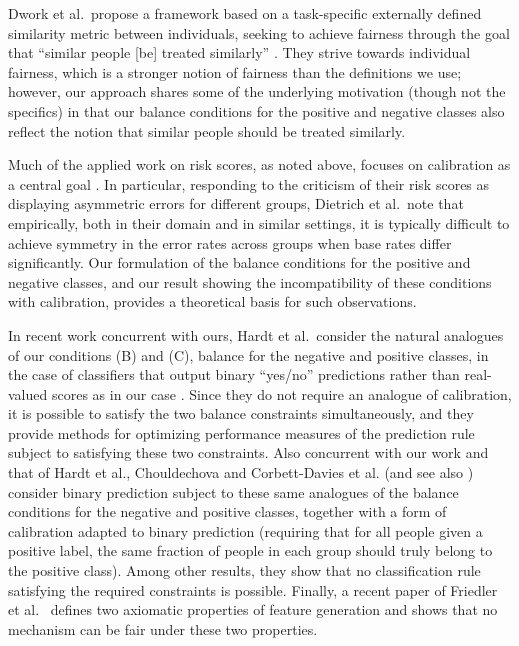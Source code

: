\documentclass[11pt]{article}
\begin{document}
Dwork et al.~propose a framework based on a task-specific externally defined
similarity metric between individuals, seeking to achieve fairness through the
goal that ``similar people [be] treated similarly''
\cite{dwork-fairness-awareness}. 
They strive towards individual fairness,
which is a stronger notion of fairness than the 
definitions we use;
however, our approach shares some of the underlying motivation
(though not the specifics) in that our balance conditions for
the positive and negative classes also reflect the notion that similar
people should be treated similarly.

Much of the applied work on risk scores, as noted above, focuses
on calibration as a central goal 
\cite{crowson-calibration-risk-scores,dieterich-northpointe-fairness,flores-re-propublica-fair}.
In particular, responding to the criticism of their risk scores as
displaying asymmetric errors for different groups,
Dietrich et al.~note that empirically, both in their domain and in similar
settings, it is typically difficult to achieve symmetry in the error rates
across groups when base rates differ significantly.
Our formulation of the balance conditions for the positive and negative
classes, and our result showing the incompatibility of these conditions
with calibration, provides a theoretical basis for such observations.

In recent work concurrent with ours, Hardt et al.~consider the natural
analogues of our conditions (B) and (C), balance for the negative and
positive classes, in the case of classifiers that output binary ``yes/no''
predictions rather than real-valued scores as in our case
\cite{hardt-fairness}.
Since they do not require an analogue of calibration, it is possible
to satisfy the two balance constraints simultaneously, and they provide
methods for optimizing performance measures of the prediction rule
subject to satisfying these two constraints.
Also concurrent with our work and that of Hardt et al.,
Chouldechova \cite{chouldechova-fair-prediction} and 
Corbett-Davies et al. \cite{washington-post}
(and see also \cite{corbett-davies-working-paper})
consider binary
prediction subject to these same analogues of the balance conditions
for the negative and positive classes, together with a form of
calibration adapted to binary prediction (requiring that 
for all people given a positive label, the same fraction
of people in each group should truly belong to the positive class).
Among other results, they show that no classification rule satisfying
the required constraints is possible.
Finally, a recent paper of Friedler et al.~\cite{suresh-impossibility}
defines two axiomatic properties of feature generation and 
shows that no mechanism can be fair under these two properties.
\end{document}
